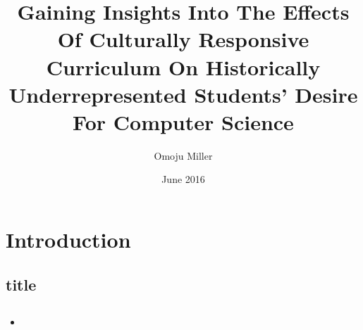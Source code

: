 \documentclass{beamer}                  %
\title[Culturally Responsive CS]{Gaining Insights Into The Effects Of Culturally Responsive Curriculum On Historically Underrepresented Students’ Desire For Computer Science}
\author[Miller]{Omoju Miller}
\institute[UC Berkeley]{University of California, Berkeley }
\date{June 2016}
\begin{document}
\section{Introduction}
    \subsection{title}
        \begin{frame}[plain]
            \titlepage
        \end{frame}

    \subsection{}
        \begin{frame}{}
            \begin{itemize}
                \item
            \end{itemize}
        \end{frame}
    

        
\printbibliography
\clearpage
\end{document}

